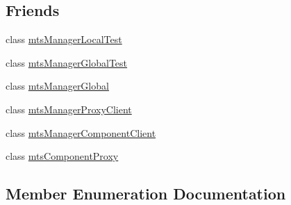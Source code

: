 \subsection*{Friends}
\begin{DoxyCompactItemize}
\item 
class \hyperlink{classmts_manager_local_adc2ae8db48d5418c526f275aafa3d4a9}{mts\+Manager\+Local\+Test}
\item 
class \hyperlink{classmts_manager_local_aad203c194c05c2d9063ff2face4590be}{mts\+Manager\+Global\+Test}
\item 
class \hyperlink{classmts_manager_local_a39a5abeb1bc2e952381b33eec702ba96}{mts\+Manager\+Global}
\item 
class \hyperlink{classmts_manager_local_a6bee6b58692a3a678a2f7543b8158fd3}{mts\+Manager\+Proxy\+Client}
\item 
class \hyperlink{classmts_manager_local_abdd48306351388730b5025e062ae1069}{mts\+Manager\+Component\+Client}
\item 
class \hyperlink{classmts_manager_local_a744ae66bbeeeba6ef38e59a2dd5e9743}{mts\+Component\+Proxy}
\end{DoxyCompactItemize}


\subsection{Member Enumeration Documentation}
\hypertarget{classmts_manager_local_ade8a34bedd1d420d29c591711913046a}{}
